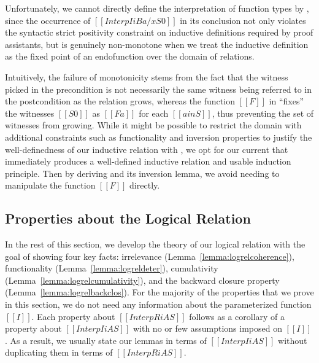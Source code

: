 \documentclass[\ifpublic nolinenum\else\fi,online,OA]{jfp}
\newcommand{\jc}[1]{}
\theoremstyle{definition}
\begin{document}
Unfortunately, we cannot directly define the interpretation of function types
by , since the occurrence of $[[Interp I i B {a/x} S0]]$ in its
conclusion not only violates the syntactic strict positivity constraint on
inductive definitions required by proof assistants,
but is genuinely non-monotone when we treat the inductive definition
as the fixed point of an endofunction over the domain of relations.
\jc{What?}
Intuitively, the failure of monotonicity stems from the fact that the witness
picked in the precondition is not necessarily the same witness being referred
to in the postcondition as the relation grows, \jc{Why?} whereas the function $[[F]]$
in  ``fixes'' the witnesses $[[S0]]$ as $[[F a]]$ for each
$[[a in S]]$, thus preventing the set of witnesses from growing. While it might
be possible to restrict the domain with additional constraints such as
functionality and inversion properties to justify the well-definedness of our
inductive relation with , we opt for our current
 that immediately produces a
well-defined inductive relation and usable induction principle.
Then by deriving  and its inversion lemma,
we avoid needing to manipulate the function $[[F]]$ directly.

\subsection{Properties about the Logical Relation}
In the rest of this section, we develop the theory of our logical relation
with the goal of showing four key facts: irrelevance
(Lemma~\ref{lemma:logrelcoherence}), functionality
(Lemma~\ref{lemma:logreldeter}), cumulativity
(Lemma~\ref{lemma:logrelcumulativity}), and the backward closure property
(Lemma~\ref{lemma:logrelbackclos}).  For the majority of the properties that
we prove in this section, we do not need any information about the
parameterized function $[[I]]$.  Each property about $[[InterpR i A S]]$
follows as a corollary of a property about $[[Interp I i A S]]$ with no or few
assumptions imposed on $[[I]]$. As a result, we usually state our lemmas in
terms of $[[Interp I i A S]]$ without duplicating them in terms of
$[[InterpR i A S]]$.
\end{document}
